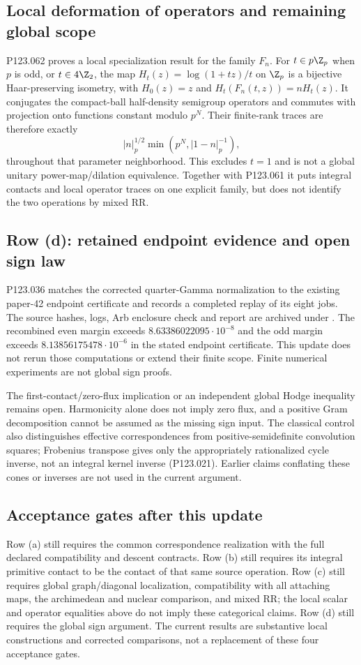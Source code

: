 \subsection{Local deformation of operators and remaining global scope}
P123.062 proves a local specialization result for the family $F_n$.
For $t\in p\Z_p$ when $p$ is odd, or $t\in4\Z_2$, the map
$H_t(z)=\log(1+tz)/t$ on $\Z_p$ is a bijective Haar-preserving isometry,
with $H_0(z)=z$ and $H_t(F_n(t,z))=nH_t(z)$.
It conjugates the compact-ball half-density semigroup operators and
commutes with projection onto functions constant modulo $p^N$. Their
finite-rank traces are therefore exactly
\[
 |n|_p^{1/2}\min(p^N,|1-n|_p^{-1}),
\]
throughout that parameter neighborhood. This excludes $t=1$ and is not
a global unitary power-map/dilation equivalence. Together with P123.061
it puts integral contacts and local operator traces on one explicit
family, but does not identify the two operations by mixed RR.

\subsection{Row (d): retained endpoint evidence and open sign law}
P123.036 matches the corrected quarter-Gamma normalization to the existing
paper-42 endpoint certificate and records a completed replay of its eight
jobs. The source hashes, logs, Arb enclosure check and report are archived
under .
The recombined even margin exceeds $8.63386022095\cdot10^{-8}$ and the
odd margin exceeds $8.13856175478\cdot10^{-6}$ in the stated endpoint
certificate. This update does not rerun those computations or extend
their finite scope. Finite numerical experiments are not global sign proofs.

The first-contact/zero-flux implication or an independent global Hodge
inequality remains open. Harmonicity alone does not imply zero flux,
and a positive Gram decomposition cannot be assumed as the missing sign
input. The classical control also distinguishes effective correspondences
from positive-semidefinite convolution squares; Frobenius transpose gives
only the appropriately rationalized cycle inverse, not an integral kernel
inverse (P123.021). Earlier claims conflating these cones or inverses are
not used in the current argument.

\subsection{Acceptance gates after this update}
Row (a) still requires the common correspondence realization with the full
declared compatibility and descent contracts. Row (b) still requires its
integral primitive contact to be the contact of that same source operation.
Row (c) still requires global graph/diagonal localization, compatibility
with all attaching maps, the archimedean and nuclear comparison, and mixed
RR; the local scalar and operator equalities above do not imply these
categorical claims. Row (d) still requires the global sign argument.
The current results are substantive local constructions and corrected
comparisons, not a replacement of these four acceptance gates.

